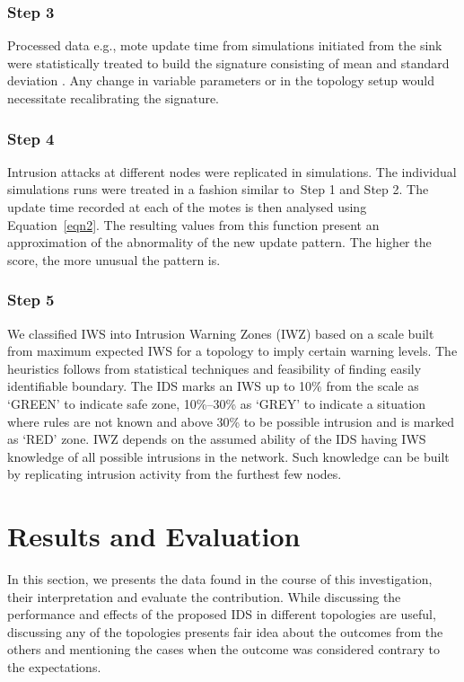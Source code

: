 \documentclass[conference]{IEEEtran}
\begin{document}
\subsubsection*{Step 3} 
Processed data e.g., mote update time from simulations initiated from the sink were statistically treated to build the signature consisting of mean and standard deviation .
Any change in variable parameters or in the topology setup would necessitate recalibrating the signature.

\subsubsection*{Step 4} 
Intrusion attacks at different nodes were replicated in simulations.
The individual simulations runs were treated in a fashion  similar to~Step 1 and Step 2.
The update time recorded at each of the motes is then analysed using Equation~\ref{eqn2}.
The resulting values from this function present an approximation of the abnormality of the new update pattern. The higher the score, the more unusual the pattern is. 

\subsubsection*{Step 5} 
We classified IWS into Intrusion Warning Zones (IWZ) based on a scale built from maximum expected IWS for a topology to imply certain warning levels.
The heuristics follows from statistical techniques and feasibility of finding easily identifiable boundary.
The IDS marks an IWS up to 10\% from the scale as `GREEN' to indicate safe zone,
10\%--30\% as `GREY' to indicate a situation where rules are not known and 
above 30\% to be possible intrusion and is marked as `RED' zone.
IWZ depends on the assumed ability of the IDS having IWS knowledge of all possible intrusions in the network.
Such knowledge can be built by replicating intrusion activity from the furthest few nodes.

\section{Results and Evaluation}
\label{sec:eval}


In this section, we presents the data found in the course of this investigation, their interpretation and evaluate the contribution.
While discussing the performance and effects of the proposed IDS in different topologies are useful, discussing any of the topologies presents fair idea about the outcomes from the others and mentioning the cases when the outcome was considered  contrary to the expectations.
\end{document}
